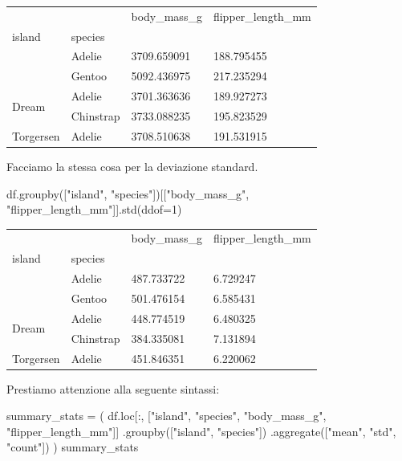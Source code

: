 \documentclass[
  letterpaper,
  krantz2]{{[}./krantz{]}}
\newenvironment{Shaded}{\begin{snugshade}}{\end{snugshade}}
\newcommand{\DecValTok}[1]{\textcolor[rgb]{0.68,0.00,0.00}{#1}}
\newcommand{\NormalTok}[1]{\textcolor[rgb]{0.00,0.23,0.31}{#1}}
\newcommand{\OperatorTok}[1]{\textcolor[rgb]{0.37,0.37,0.37}{#1}}
\newcommand{\StringTok}[1]{\textcolor[rgb]{0.13,0.47,0.30}{#1}}
\begin{document}
\begin{longtable}[]{@{}llll@{}}
\toprule\noalign{}
& & body\_mass\_g & flipper\_length\_mm \\
island & species & & \\
\midrule\noalign{}
\endhead
\bottomrule\noalign{}
\endlastfoot
\multirow{2}{=}{Biscoe} & Adelie & 3709.659091 & 188.795455 \\
& Gentoo & 5092.436975 & 217.235294 \\
\multirow{2}{=}{Dream} & Adelie & 3701.363636 & 189.927273 \\
& Chinstrap & 3733.088235 & 195.823529 \\
Torgersen & Adelie & 3708.510638 & 191.531915 \\
\end{longtable}

Facciamo la stessa cosa per la deviazione standard.

\begin{Shaded}
\begin{Highlighting}[]
\NormalTok{df.groupby([}\StringTok{"island"}\NormalTok{, }\StringTok{"species"}\NormalTok{])[[}\StringTok{"body\_mass\_g"}\NormalTok{, }\StringTok{"flipper\_length\_mm"}\NormalTok{]].std(ddof}\OperatorTok{=}\DecValTok{1}\NormalTok{)}
\end{Highlighting}
\end{Shaded}

\begin{longtable}[]{@{}llll@{}}
\toprule\noalign{}
& & body\_mass\_g & flipper\_length\_mm \\
island & species & & \\
\midrule\noalign{}
\endhead
\bottomrule\noalign{}
\endlastfoot
\multirow{2}{=}{Biscoe} & Adelie & 487.733722 & 6.729247 \\
& Gentoo & 501.476154 & 6.585431 \\
\multirow{2}{=}{Dream} & Adelie & 448.774519 & 6.480325 \\
& Chinstrap & 384.335081 & 7.131894 \\
Torgersen & Adelie & 451.846351 & 6.220062 \\
\end{longtable}

Prestiamo attenzione alla seguente sintassi:

\begin{Shaded}
\begin{Highlighting}[]
\NormalTok{summary\_stats }\OperatorTok{=}\NormalTok{ (}
\NormalTok{    df.loc[:, [}\StringTok{"island"}\NormalTok{, }\StringTok{"species"}\NormalTok{, }\StringTok{"body\_mass\_g"}\NormalTok{, }\StringTok{"flipper\_length\_mm"}\NormalTok{]]}
\NormalTok{    .groupby([}\StringTok{"island"}\NormalTok{, }\StringTok{"species"}\NormalTok{])}
\NormalTok{    .aggregate([}\StringTok{"mean"}\NormalTok{, }\StringTok{"std"}\NormalTok{, }\StringTok{"count"}\NormalTok{])}
\NormalTok{)}
\NormalTok{summary\_stats}
\end{Highlighting}
\end{Shaded}
\end{document}
